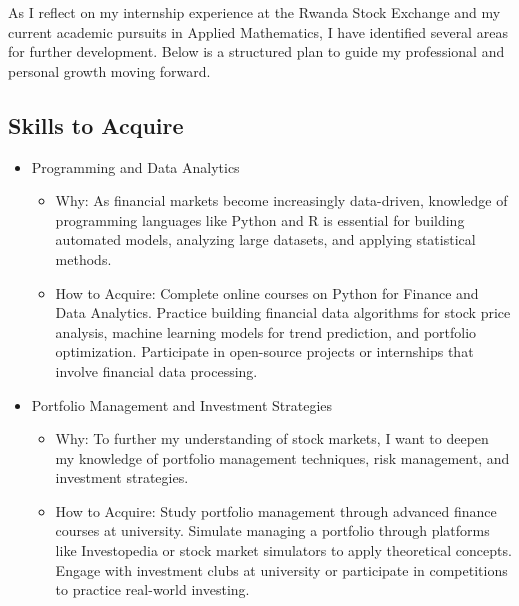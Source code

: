 \documentclass{article}
\begin{document}
\begin{titlepage}
\begin{titlepage}
\begin{flushleft}
\begin{flushleft}
As I reflect on my internship experience at the Rwanda Stock Exchange and my current academic pursuits in Applied Mathematics, I have identified several areas for further development. Below is a structured plan to guide my professional and personal growth moving forward.
\vspace{0.3cm}

\subsection{\textbf{\Large{Skills to Acquire}}}
\begin{itemize}
    \item Programming and Data Analytics
\begin{itemize}
    \item 

Why: As financial markets become increasingly data-driven, knowledge of programming languages like Python and R is essential for building automated models, analyzing large datasets, and applying statistical methods.
\item 
How to Acquire:
Complete online courses on Python for Finance and Data Analytics.
Practice building financial data algorithms for stock price analysis, machine learning models for trend prediction, and portfolio optimization.
Participate in open-source projects or internships that involve financial data processing.
\end{itemize}

\item Portfolio Management and Investment Strategies

\begin{itemize}
    \item 

Why: To further my understanding of stock markets, I want to deepen my knowledge of portfolio management techniques, risk management, and investment strategies.
\item 
How to Acquire:
Study portfolio management through advanced finance courses at university.
Simulate managing a portfolio through platforms like Investopedia or stock market simulators to apply theoretical concepts.
Engage with investment clubs at university or participate in competitions to practice real-world investing.

\newpage

\end{itemize}

\end{itemize}
\vspace{0.5cm}


\end{flushleft}
\end{flushleft}
\end{titlepage}
\end{titlepage}
\end{document}
